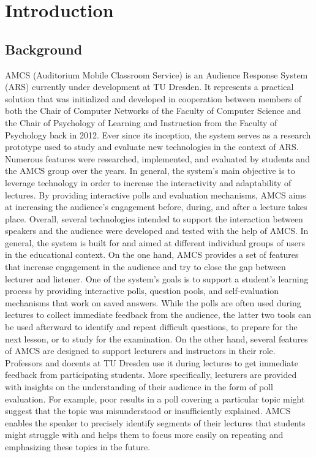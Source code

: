 \chapter{Introduction}

\section{Background}

AMCS (Auditorium Mobile Classroom Service) is an Audience Response System (ARS) currently under development at TU Dresden.
It represents a practical solution that was initialized and developed in cooperation between members of both the Chair of Computer Networks of the Faculty of Computer Science and the Chair of Psychology of Learning and Instruction from the Faculty of Psychology back in 2012. Ever since its inception, the system serves as a research prototype used to study and evaluate new technologies in the context of ARS. Numerous features were researched, implemented, and evaluated by students and the AMCS group over the years.
\newline
\newline
In general, the system's main objective is to leverage technology in order to increase the interactivity and adaptability of lectures. By providing interactive polls and evaluation mechanisms, AMCS aims at increasing the audience's engagement before, during, and after a lecture takes place. Overall, several technologies intended to support the interaction between speakers and the audience were developed and tested with the help of AMCS.
\newline
\newline
In general, the system is built for and aimed at different individual groups of users in the educational context. On the one hand, AMCS provides a set of features that increase engagement in the audience and try to close the gap between lecturer and listener. One of the system's goals is to support a student's learning process by providing interactive polls, question pools, and self-evaluation mechanisms that work on saved answers. While the polls are often used during lectures to collect immediate feedback from the audience, the latter two tools can be used afterward to identify and repeat difficult questions, to prepare for the next lesson, or to study for the examination.
\newline
\newline
On the other hand, several features of AMCS are designed to support lecturers and instructors in their role. Professors and docents at TU Dresden use it during lectures to get immediate feedback from participating students. More specifically, lecturers are provided with insights on the understanding of their audience in the form of poll evaluation. For example, poor results in a poll covering a particular topic might suggest that the topic was misunderstood or insufficiently explained. AMCS enables the speaker to precisely identify segments of their lectures that students might struggle with and helps them to focus more easily on repeating and emphasizing these topics in the future. 

